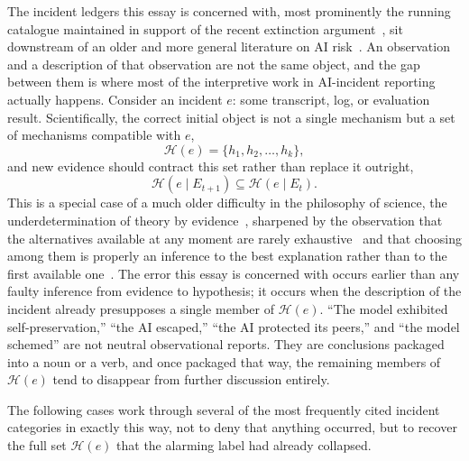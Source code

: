 \documentclass[11pt]{article}
\begin{document}
The incident ledgers this essay is concerned with, most prominently the running catalogue maintained in support of the recent extinction argument~\cite{yudkowskysoares2025,miriSupportingEvidence}, sit downstream of an older and more general literature on AI risk~\cite{bostrom2014,omohundro2008,russell2019,amodei2016}. An observation and a description of that observation are not the same object, and the gap between them is where most of the interpretive work in AI-incident reporting actually happens. Consider an incident $e$: some transcript, log, or evaluation result. Scientifically, the correct initial object is not a single mechanism but a set of mechanisms compatible with $e$,
\[
\mathcal{H}(e) = \{h_1, h_2, \dots, h_k\},
\]
and new evidence should contract this set rather than replace it outright,
\[
\mathcal{H}(e \mid E_{t+1}) \subseteq \mathcal{H}(e \mid E_t).
\]
This is a special case of a much older difficulty in the philosophy of science, the underdetermination of theory by evidence~\cite{quine1951,duhem1954,vanfraassen1980}, sharpened by the observation that the alternatives available at any moment are rarely exhaustive~\cite{stanford2006} and that choosing among them is properly an inference to the best explanation rather than to the first available one~\cite{lipton2004}. The error this essay is concerned with occurs earlier than any faulty inference from evidence to hypothesis; it occurs when the description of the incident already presupposes a single member of $\mathcal{H}(e)$. ``The model exhibited self-preservation,'' ``the AI escaped,'' ``the AI protected its peers,'' and ``the model schemed'' are not neutral observational reports. They are conclusions packaged into a noun or a verb, and once packaged that way, the remaining members of $\mathcal{H}(e)$ tend to disappear from further discussion entirely.

The following cases work through several of the most frequently cited incident categories in exactly this way, not to deny that anything occurred, but to recover the full set $\mathcal{H}(e)$ that the alarming label had already collapsed.
\end{document}
